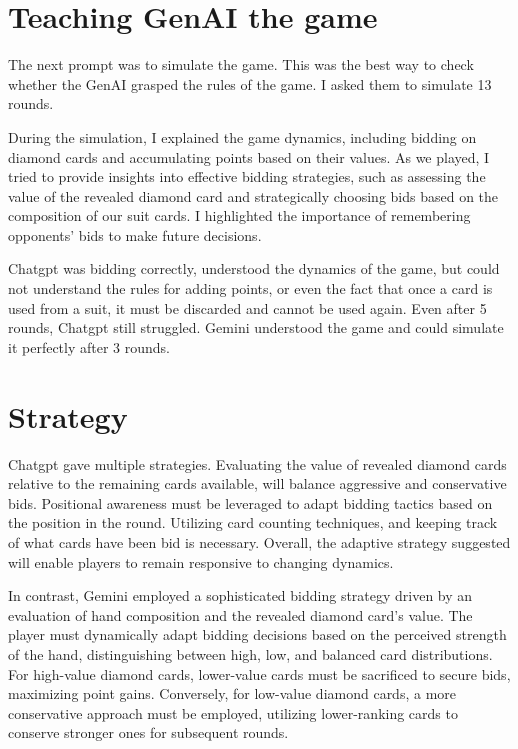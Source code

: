 \documentclass[11pt]{article}
\begin{document}
\section{Teaching GenAI the game}
The next prompt was to simulate the game. This was the best way to check whether the GenAI grasped the rules of the game. I asked them to simulate 13 rounds.
\vspace{10pt}

During the simulation, I explained the game dynamics, including bidding on diamond cards and accumulating points based on their values. As we played, I tried to provide insights into effective bidding strategies, such as assessing the value of the revealed diamond card and strategically choosing bids based on the composition of our suit cards. I highlighted the importance of remembering opponents' bids to make future decisions.
\vspace{10pt}

Chatgpt was bidding correctly, understood the dynamics of the game, but could not understand the rules for adding points, or even the fact that once a card is used from a suit, it must be discarded and cannot be used again. Even after 5 rounds, Chatgpt still struggled. Gemini understood the game and could simulate it perfectly after 3 rounds.

\section{Strategy}
Chatgpt gave multiple strategies. Evaluating the value of revealed diamond cards relative to the remaining cards available, will balance aggressive and conservative bids. Positional awareness must be leveraged to adapt bidding tactics based on the position in the round. Utilizing card counting techniques, and keeping track of what cards have been bid is necessary. Overall, the adaptive strategy suggested will enable players to remain responsive to changing dynamics.
\vspace{10pt}

In contrast, Gemini employed a sophisticated bidding strategy driven by an evaluation of hand composition and the revealed diamond card's value. The player must dynamically adapt bidding decisions based on the perceived strength of the hand, distinguishing between high, low, and balanced card distributions. For high-value diamond cards, lower-value cards must be sacrificed to secure bids, maximizing point gains. Conversely, for low-value diamond cards, a more conservative approach must be employed, utilizing lower-ranking cards to conserve stronger ones for subsequent rounds.
\end{document}
